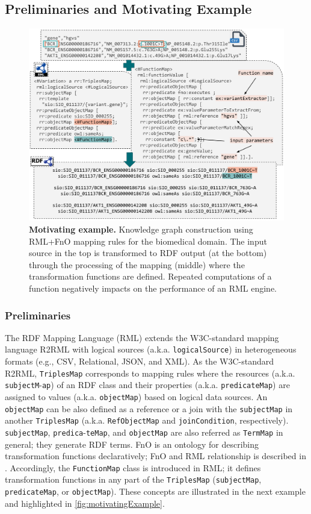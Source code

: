 \subsection{Preliminaries and Motivating Example}
\label{sec:example}
\begin{figure}[t!]
\centering
\includegraphics[width=\textwidth]{figures/motivating_example.png}
\caption[FunMap motivating example]{\textbf{Motivating example.} Knowledge graph construction using RML+FnO mapping rules for the biomedical domain. The input source in the top is transformed to RDF output (at the bottom) through the processing of the mapping (middle) where the transformation functions are defined. Repeated computations of a function negatively impacts on the performance of an RML engine.} 
\label{fig:motivatingExample}
\end{figure}

\subsubsection{Preliminaries}
\label{sec:preliminaries}
The RDF Mapping Language (RML) extends the W3C-standard mapping language R2RML with logical sources (a.k.a. \verb|logicalSource|) in heterogeneous formats (e.g., CSV, Relational, JSON, and XML). As the W3C-standard R2RML, \verb|TriplesMap| corresponds to mapping rules where the resources (a.k.a. \verb|subjectM|-\verb|ap|) of an RDF class and their properties (a.k.a. \verb|predicateMap|) are assigned to values (a.k.a. \verb|objectMap|) based on logical data sources. An \verb|objectMap| can be also defined as a reference or a join with the \verb|subjectMap| in another \verb|TriplesMap| (a.k.a. \verb|RefObjectMap| and \verb|joinCondition|, respectively). \verb|subjectMap|, \verb|predica|-\verb|teMap|, and \verb|objectMap| are also referred as \verb|TermMap| in general; they generate RDF terms. FnO is an ontology for describing transformation functions declaratively; FnO and RML relationship is described in \cite{de2017declarative}. Accordingly, the \verb|FunctionMap| class is introduced in RML; it defines transformation functions in any part of the \verb|TriplesMap| (\verb|subjectMap|, \verb|predicateMap|, or \verb|objectMap|). These concepts are illustrated in the next example and highlighted in \autoref{fig:motivatingExample}.

